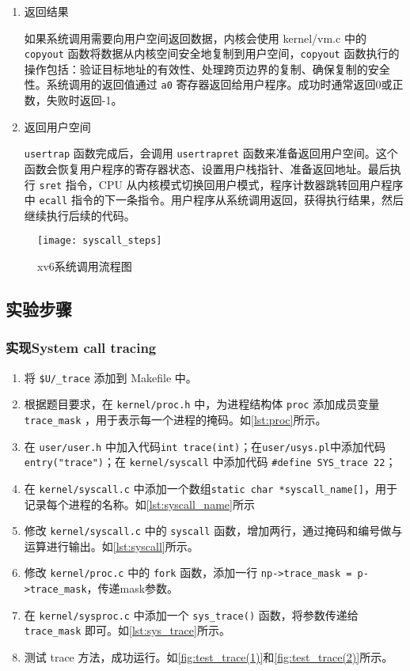 \begin{enumerate}
	\item 返回结果
	
	如果系统调用需要向用户空间返回数据，内核会使用 kernel/vm.c 中的 \texttt{copyout} 函数将数据从内核空间安全地复制到用户空间，\texttt{copyout} 函数执行的操作包括：验证目标地址的有效性、处理跨页边界的复制、确保复制的安全性。系统调用的返回值通过 \texttt{a0} 寄存器返回给用户程序。成功时通常返回0或正数，失败时返回-1。
	
	\item 返回用户空间
	
	\texttt{usertrap} 函数完成后，会调用 \texttt{usertrapret} 函数来准备返回用户空间。这个函数会恢复用户程序的寄存器状态、设置用户栈指针、准备返回地址。最后执行 \texttt{sret} 指令，CPU 从内核模式切换回用户模式，程序计数器跳转回用户程序中 \texttt{ecall} 指令的下一条指令。用户程序从系统调用返回，获得执行结果，然后继续执行后续的代码。
\end{enumerate}

\begin{figure}[!htb]
	\centering
	\texttt{[image: syscall\_steps]}
	\caption{xv6系统调用流程图}
	\label{fig:syscall_steps}
\end{figure}

\subsection{实验步骤}

\subsubsection{实现System call tracing}

\begin{enumerate}
	\item 将 \texttt{\$U/\_trace} 添加到 Makefile 中。
	\item 根据题目要求，在 \texttt{kernel/proc.h} 中，为进程结构体 \texttt{proc} 添加成员变量 \texttt{trace\_mask} ，用于表示每一个进程的掩码。如\cref{lst:proc}所示。
	\item 在 \texttt{user/user.h} 中加入代码\texttt{int trace(int)}；在\texttt{user/usys.pl}中添加代码\texttt{entry("trace")}；在 \texttt{kernel/syscall} 中添加代码 \texttt{\#define SYS\_trace 22}；
	\item 在 \texttt{kernel/syscall.c} 中添加一个数组\texttt{static char *syscall\_name[]}，用于记录每个进程的名称。如\cref{lst:syscall_name}所示
	\item 修改 \texttt{kernel/syscall.c} 中的 \texttt{syscall} 函数，增加两行，通过掩码和编号做与运算进行输出。如\cref{lst:syscall}所示。
	\item 修改 \texttt{kernel/proc.c} 中的 \texttt{fork} 函数，添加一行 \texttt{np->trace\_mask = p->trace\_mask}，传递mask参数。
	\item 在 \texttt{kernel/sysproc.c} 中添加一个 \texttt{sys\_trace()} 函数，将参数传递给 \texttt{trace\_mask} 即可。如\cref{lst:sys_trace}所示。
	\item 测试 trace 方法，成功运行。如\cref{fig:test_trace(1)}和\cref{fig:test_trace(2)}所示。
\end{enumerate}

